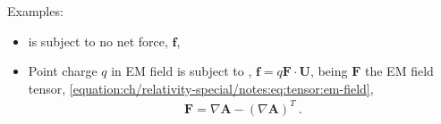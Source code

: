 \documentclass[letterpaper,10pt,english]{jupyterBook}
\begin{document}
\sphinxAtStartPar
Examples:
\begin{itemize}
\item {} 
\sphinxAtStartPar
{} is subject to no net force, \(\mathbf{f}\),

\item {} 
\sphinxAtStartPar
Point charge \(q\) in EM field is subject to , \(\mathbf{f} = q \mathbf{F} \cdot \mathbf{U}\), being \(\mathbf{F}\) the EM field tensor, \eqref{equation:ch/relativity-special/notes:eq:tensor:em-field},
\begin{equation*}
\begin{split}\mathbf{F} = \nabla \mathbf{A} - \left( \nabla \mathbf{A} \right)^T \ .\end{split}
\end{equation*}
\end{itemize}
\end{document}
